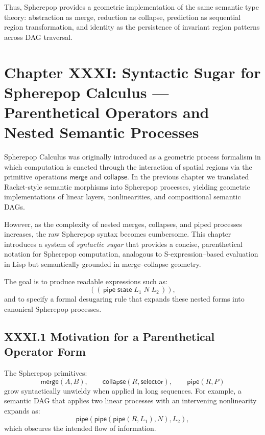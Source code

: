 \documentclass[12pt,letterpaper]{article}
\begin{document}
Thus, Spherepop provides a geometric implementation of the same semantic type theory: abstraction as merge, reduction as collapse, prediction as sequential region transformation, and identity as the persistence of invariant region patterns across DAG traversal.

\newpage

\section{Chapter XXXI: Syntactic Sugar for Spherepop Calculus —  
Parenthetical Operators and Nested Semantic Processes}

Spherepop Calculus was originally introduced as a geometric process formalism in which computation is enacted through the interaction of spatial regions via the primitive operations $\mathsf{merge}$ and $\mathsf{collapse}$. In the previous chapter we translated Racket-style semantic morphisms into Spherepop processes, yielding geometric implementations of linear layers, nonlinearities, and compositional semantic DAGs.

However, as the complexity of nested merges, collapses, and piped processes increases, the raw Spherepop syntax becomes cumbersome. This chapter introduces a system of \emph{syntactic sugar} that provides a concise, parenthetical notation for Spherepop computation, analogous to S-expression–based evaluation in Lisp but semantically grounded in merge--collapse geometry.

The goal is to produce readable expressions such as:
\[
((\,\mathsf{pipe}\; \mathsf{state}\; L_1\; N\; L_2\,)),
\]
and to specify a formal desugaring rule that expands these nested forms into canonical Spherepop processes.

\subsection{XXXI.1 Motivation for a Parenthetical Operator Form}

The Spherepop primitives:
\[
\mathsf{merge}(A,B), \qquad
\mathsf{collapse}(R, \mathsf{selector}), \qquad
\mathsf{pipe}(R, P)
\]
grow syntactically unwieldy when applied in long sequences. For example, a semantic DAG that applies two linear processes with an intervening nonlinearity expands as:
\[
\mathsf{pipe}( \mathsf{pipe}( \mathsf{pipe}(R, L_1), N), L_2),
\]
which obscures the intended flow of information.
\end{document}
